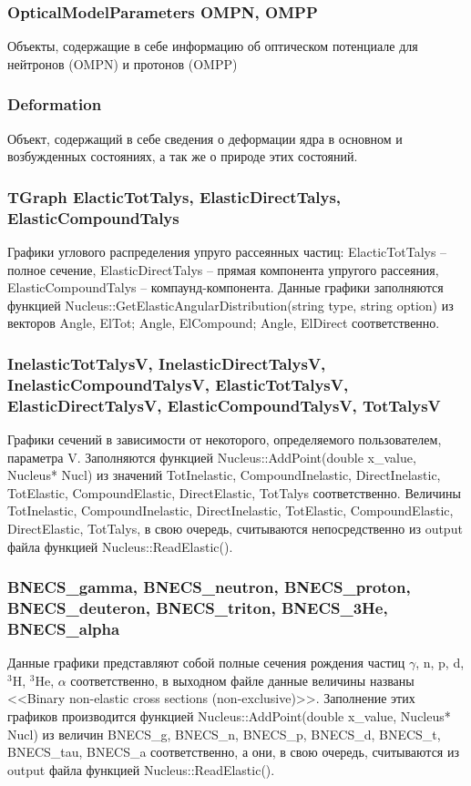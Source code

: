 \documentclass[a4paper,12pt]{extarticle}
\begin{document}
\subsubsection{OpticalModelParameters OMPN, OMPP}
Объекты, содержащие в себе информацию об оптическом потенциале для нейтронов (OMPN) и протонов (OMPP)
\subsubsection{Deformation}
Объект, содержащий в себе сведения о деформации ядра в основном и возбужденных состояниях, а так же о природе этих состояний.
\subsubsection{TGraph ElacticTotTalys, ElasticDirectTalys, ElasticCompoundTalys}
Графики углового распределения упруго рассеянных частиц:  ElacticTotTalys -- полное сечение, ElasticDirectTalys -- прямая компонента упругого рассеяния, ElasticCompoundTalys -- компаунд-компонента. Данные графики заполняются функцией Nucleus::GetElasticAngularDistribution(string type, string option) из векторов Angle, ElTot; Angle, ElCompound; Angle, ElDirect соответственно.
\subsubsection{InelasticTotTalysV, InelasticDirectTalysV, InelasticCompoundTalysV, ElasticTotTalysV, ElasticDirectTalysV, ElasticCompoundTalysV, TotTalysV}
Графики сечений в зависимости от некоторого, определяемого пользователем, параметра V. Заполняются функцией Nucleus::AddPoint(double x_value, Nucleus* Nucl) из значений TotInelastic, CompoundInelastic, DirectInelastic, TotElastic, CompoundElastic, DirectElastic,  TotTalys соответственно. Величины TotInelastic, CompoundInelastic, DirectInelastic, TotElastic, CompoundElastic, DirectElastic,  TotTalys, в свою очередь, считываются непосредственно из output файла функцией Nucleus::ReadElastic().
\subsubsection{BNECS_gamma, BNECS_neutron, BNECS_proton, BNECS_deuteron, BNECS_triton, BNECS_3He, BNECS_alpha}
Данные графики представляют собой полные сечения рождения частиц $\gamma$, n, p, d, $^3$H, $^3$He, $\alpha$ соответственно, в выходном файле данные величины названы <<Binary non-elastic cross sections (non-exclusive)>>. Заполнение этих графиков производится функцией Nucleus::AddPoint(double x_value, Nucleus* Nucl) из величин BNECS_g, BNECS_n, BNECS_p, BNECS_d, BNECS_t, BNECS_tau, BNECS_a соответственно, а они, в свою очередь, считываются из output файла функцией Nucleus::ReadElastic().
\end{document}
